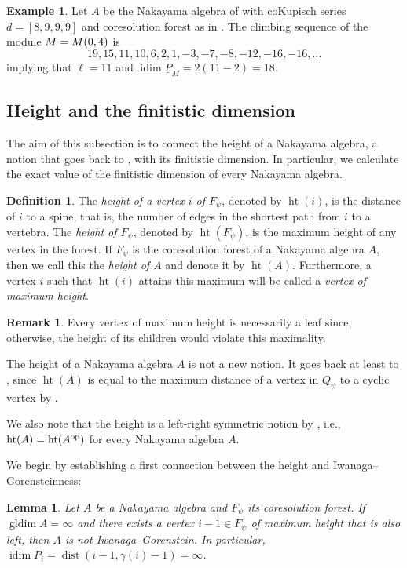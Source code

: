 \documentclass[a4paper]{amsart}
\newtheorem{lemma}[theorem]{Lemma}
\theoremstyle{definition}
\newtheorem{definition}[theorem]{Definition}
\newtheorem{remark}[theorem]{Remark}
\newtheorem{example}[theorem]{Example}
\theoremstyle{remark}
\numberwithin{equation}{theorem}
\newcommand{\Dfn}[1]{\emph{\color{blue}#1}} %
\newcommand{\pstab}[1]{\underline{P}_{#1}}
\newcommand{\height}{\operatorname{ht}}
\newcommand{\idim}{\operatorname{idim}}
\newcommand{\gldim}{\operatorname{gldim}}
\newcommand{\dist}{\operatorname{dist}}
\newcommand{\psiforest}{F_\psi}
\newcommand{\psiquiver}{Q_\psi}
\newcommand{\op}{\textnormal{op}}
\begin{document}
\begin{example}
     Let $ A $ be the Nakayama algebra of  with coKupisch series $ d = [8,9,9,9] $ and coresolution forest as in . The climbing sequence of the module $M=\mik[0][4]$ is $$19,15,11,10,6,2,1,-3,-7,-8,-12,-16,-16,\dots $$
     implying that $\ell = 11$ and $\idim\pstab{M} = 2(11-2) = 18$.
\end{example}

\subsection{Height and the finitistic dimension}\label{compute.fin.dim}

The aim of this subsection is to connect the height of a Nakayama algebra, a notion that goes back to \cite{G}, with its finitistic dimension. In particular, we calculate the exact value of the finitistic dimension of every Nakayama algebra.

\begin{definition}\label{def:height}
    The \Dfn{height of a vertex $i $ of $ \psiforest $}, denoted by $\height(i)$, is the distance of $ i $ to a spine, that is, the number of edges in the shortest path from $ i $ to a vertebra. 
    The \Dfn{height of $\psiforest$}, denoted by $\height(\psiforest)$, is the maximum height of any vertex in the forest. If $ \psiforest $ is the coresolution forest of a Nakayama algebra $ A $, then we call this the \Dfn{height of $ A $} and denote it by $ \height(A) $. Furthermore, a vertex $ i $ such that $ \height(i) $ attains this maximum will be called a \Dfn{vertex of maximum height}.
\end{definition}

\begin{remark}
    Every vertex of maximum height is necessarily a leaf since, otherwise, the height of its children would violate this maximality.
\end{remark}

The height of a Nakayama algebra $ A $ is not a new notion. It goes back at least to \cite{G}, since $ \height(A) $ is equal to the maximum distance of a vertex in $\psiquiver$ to a cyclic vertex by .

We also note that the height is a left-right symmetric notion by \cite[Corollary~2, Appendix~A.1]{Ri2}, i.e., $ \height (A) = \height (A^{\op}) $ for every Nakayama algebra $ A $.


We begin by establishing a first connection between the height and Iwanaga--Gorensteinness:\begin{lemma}\label{lem:non.IG}Let $A$ be a Nakayama algebra and $\psiforest$ its coresolution forest. If $\gldim A = \infty$ and there exists a vertex $i-1 \in \psiforest$ of maximum height that is also left, then $A$ is not Iwanaga--Gorenstein. In particular, $\idim P_i = \dist(i-1,\gamma(i)-1) = \infty$.\end{lemma}
\end{document}
